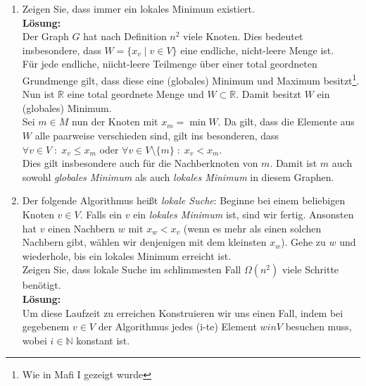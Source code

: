 \documentclass[11pt,a4paper,ngerman]{article}
\begin{document}
\begin{enumerate}[\bfseries (a)]


\item Zeigen Sie, dass immer ein lokales Minimum existiert.\\

\textbf{Lösung:}\\
Der Graph $G$ hat nach Definition $n^2$ viele Knoten. Dies bedeutet insbesondere, dass $W = \{ x_v \; | \; v \in V \}$ eine endliche, nicht-leere Menge ist.\\
Für jede endliche, niicht-leere Teilmenge über einer total geordneten Grundmenge gilt, dass diese eine (globales) Minimum und Maximum besitzt\footnote{Wie in Mafi I gezeigt wurde}. Nun ist $\mathbb{R}$ eine total geordnete Menge und $W \subset \mathbb{R}$. Damit besitzt $W$ ein (globales) Minimum.\\

Sei $m \in M$ nun der Knoten mit $x_m = \min W$. Da gilt, dass die Elemente aus $W$ alle paarweise verschieden sind, gilt ins besonderen, dass\\
$\forall v \in V \; : \; x_v \leq x_m$ oder $\forall v \in V \setminus \{m\} \; : \; x_v < x_m$.\\

Dies gilt insbesondere auch für die Nachberknoten von $m$. Damit ist $m$ auch sowohl \emph{globales Minimum} als auch \emph{lokales Minimum} in diesem Graphen.


\item Der folgende Algorithmus heißt \emph{lokale Suche}: Beginne bei einem beliebigen Knoten $v \in V$. Falls ein $v$ ein \emph{lokales Minimum} ist, sind wir fertig. Ansonsten hat $v$ einen Nachbern $w$ mit $x_w < x_v$ (wenn es mehr als einen solchen Nachbern gibt, wählen wir denjenigen mit dem kleinsten $x_w$). Gehe zu $w$ und wiederhole, bis ein lokales Minimum erreicht ist.\\

Zeigen Sie, dass lokale Suche im schlimmesten Fall $\Omega (n^2)$ viele Schritte benötigt.\\

\textbf{Lösung:}\\

Um diese Laufzeit zu erreichen Konstruieren wir uns einen Fall, indem bei gegebenem $v\in V$ der Algorithmus jedes (i-te) Element $w in V$ besuchen muss, wobei $i\in \mathbb{N}$ konstant ist.\\


\end{enumerate}
\end{document}
